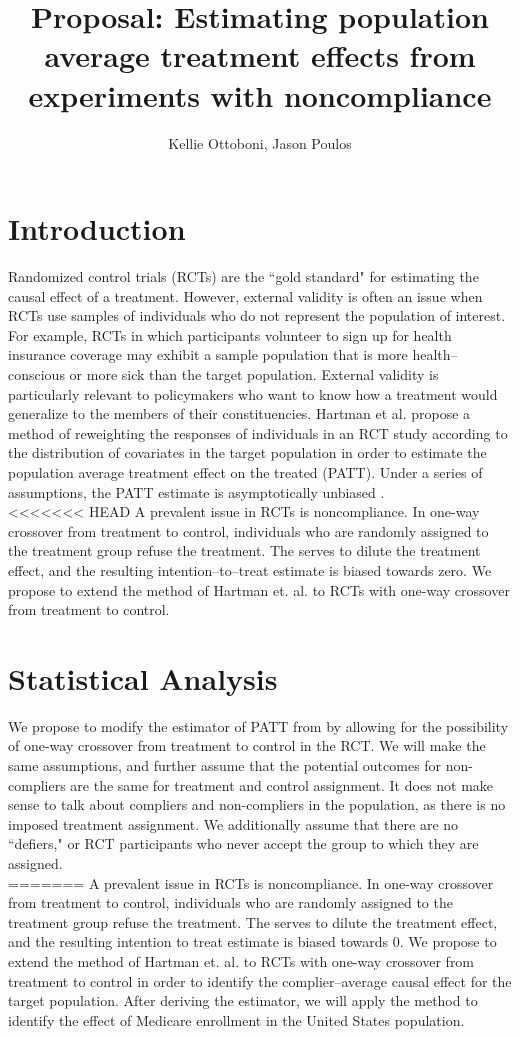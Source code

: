 \documentclass{article}
\title{Proposal: Estimating population average treatment effects from experiments with noncompliance}
\author{Kellie Ottoboni, Jason Poulos}
\begin{document}
\maketitle

\section{Introduction}
Randomized control trials (RCTs) are the ``gold standard" for estimating the causal effect of a treatment.  However, external validity is often an issue when RCTs use samples of individuals who do not represent the population of interest.  For example, RCTs in which participants volunteer to sign up for health insurance coverage may exhibit a sample population that is more health--conscious or more sick than the target population.  External validity is particularly relevant to policymakers who want to know how a treatment would generalize to the members of their constituencies. Hartman et al. propose a method of reweighting the responses of individuals in an RCT study according to the distribution of covariates in the target population in order to estimate the population average treatment effect on the treated (PATT).  Under a series of assumptions, the PATT estimate is asymptotically unbiased \cite{Hartman}. \\

<<<<<<< HEAD
A prevalent issue in RCTs is noncompliance.  In one-way crossover from treatment to control, individuals who are randomly assigned to the treatment group refuse the treatment.  The serves to dilute the treatment effect, and the resulting intention--to--treat estimate is biased towards zero.  We propose to extend the method of Hartman et. al. to RCTs with one-way crossover from treatment to control.

\section{Statistical Analysis}
We propose to modify the estimator of PATT from \cite{Hartman} by allowing for the possibility of one-way crossover from treatment to control in the RCT.  We will make the same assumptions, and further assume that the potential outcomes for non-compliers are the same for treatment and control assignment.  It does not make sense to talk about compliers and non-compliers in the population, as there is no imposed treatment assignment.  We additionally assume that there are no ``defiers," or RCT participants who never accept the group to which they are assigned. \\
=======
A prevalent issue in RCTs is noncompliance.  In one-way crossover from treatment to control, individuals who are randomly assigned to the treatment group refuse the treatment.  The serves to dilute the treatment effect, and the resulting intention to treat estimate is biased towards $0$.  We propose to extend the method of Hartman et. al. to RCTs with one-way crossover from treatment to control in order to identify the complier--average causal effect for the target population.  After deriving the estimator, we will apply the method to identify the effect of Medicare enrollment in the United States population.
\end{document}
